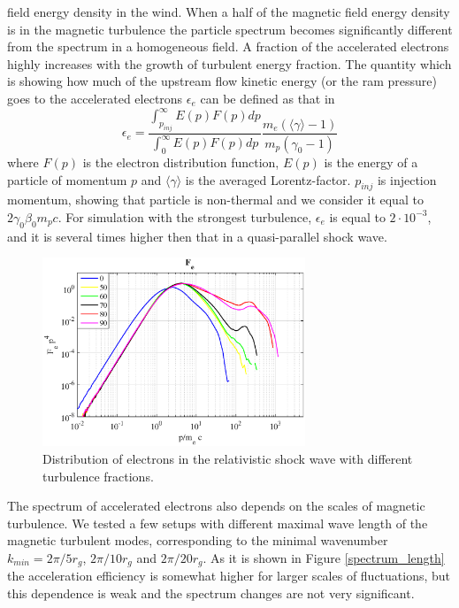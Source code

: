 \documentclass[a4paper]{jpconf}
\begin{document}
field energy density in the wind. 
When a half of the magnetic field energy density is in the magnetic turbulence the particle spectrum becomes significantly 
different from the spectrum in a homogeneous field. A fraction of the accelerated electrons highly increases with the growth of turbulent energy fraction. 
The quantity which is showing how much of the upstream flow kinetic energy (or the ram pressure) goes to the accelerated electrons 
$\epsilon_e$ can be defined as that in \cite{Crumley2019}
\begin{equation}
\epsilon_e = \frac{\int_{p_{inj}}^{\infty}E(p)F(p)dp}{\int_{0}^{\infty}E(p)F(p)dp }\frac{m_e(\langle \gamma \rangle - 1)}{m_p (\gamma_0 - 1)}
\end{equation}
where $F(p)$ is the electron distribution function, $E(p)$ is the energy of a particle of momentum $p$ and $\langle \gamma \rangle$ is the averaged Lorentz-factor. 
$p_{inj}$ is injection momentum, showing that particle is non-thermal and we consider it equal to $2 \gamma_0 \beta_0 m_p c$. For simulation with the strongest turbulence, $\epsilon_e$ is equal to $2\cdot10^{-3}$, and it is several times higher then that in a quasi-parallel shock wave.
\begin{figure}[h!]
	\centering
	\includegraphics[width=0.7\textwidth]{fig/spectrum.eps} 
	\caption{Distribution of electrons in the relativistic shock wave with different turbulence fractions.}
	\label{spectrum}
\end{figure} 

The spectrum of accelerated electrons also depends on the scales of magnetic turbulence. We tested a few setups with different maximal wave length of the magnetic turbulent modes, corresponding to the minimal wavenumber $k_{min} = 2 \pi / 5 r_g$, $2 \pi / 10 r_g$ and $ 2 \pi /20 r_g$. As it is shown in Figure \ref{spectrum_length} the acceleration efficiency is somewhat higher for larger scales of fluctuations, but this dependence is weak and the spectrum changes are not very significant.
\end{document}
